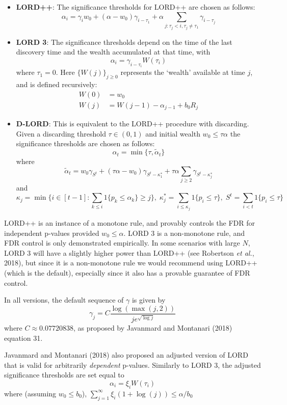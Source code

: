 \documentclass[
]{article}
\begin{document}
\begin{itemize}
\item
  \textbf{LORD++}: The significance thresholds for LORD++ are chosen as
  follows: \[
  \alpha_i = \gamma_i w_0 + (\alpha - w_0) \gamma_{i-\tau_1} + 
  \alpha \sum_{j : \tau_j < i, \tau_j \neq \tau_1} \gamma_{i - \tau_j}
  \]
\item
  \textbf{LORD 3}: The significance thresholds depend on the time of the
  last discovery time and the wealth accumulated at that time, with \[
  \alpha_i  = \gamma_{i - \tau_i} W(\tau_i)
  \] where \(\tau_1 = 0\). Here \(\{W(j)\}_{j \geq 0}\) represents the
  `wealth' available at time \(j\), and is defined recursively: \[
  \begin{align}
  W(0) & = w_0 \nonumber \\
  W(j) & = W(j-1) - \alpha_{j-1} + b_0 R_j
  \end{align}
  \]
\item
  \textbf{D-LORD}: This is equivalent to the LORD++ procedure with
  discarding. Given a discarding threshold \(\tau \in (0,1)\) and
  initial wealth \(w_0 \leq \tau\alpha\) the significance thresholds are
  chosen as follows: \[ 
  \alpha_t = \min\{\tau, \tilde{\alpha}_t\}
  \] where \[
  \tilde{\alpha}_t = w_0 \gamma_{S^t} +
  (\tau\alpha - w_0)\gamma_{S^t - \kappa_1^*} + 
  \tau\alpha \sum_{j \geq 2} \gamma_{S^t - \kappa_j^*}
  \] and \[
  \kappa_j = \min\{i \in [t-1] : \sum_{k \leq i} 
  1 \{p_k \leq \alpha_k\} \geq j\}, \;
  \kappa_j^* = \sum_{i \leq \kappa_j} 1 \{p_i \leq \tau \}, \;
  S^t = \sum_{i < t} 1 \{p_i \leq \tau \}
  \]
\end{itemize}

LORD++ is an instance of a monotone rule, and provably controls the FDR
for independent p-values provided \(w_0 \leq \alpha\). LORD 3 is a
non-monotone rule, and FDR control is only demonstrated empirically. In
some scenarios with large \(N\), LORD 3 will have a slightly higher
power than LORD++ (see Robertson \emph{et al.}, 2018), but since it is a
non-monotone rule we would recommend using LORD++ (which is the
default), especially since it also has a provable guarantee of FDR
control.

In all versions, the default sequence of \(\gamma\) is given by
\[\gamma_j = C \frac{\log(\max(j, 2))}{j e^{\sqrt{\log j}}}\] where
\(C \approx 0.07720838\), as proposed by Javanmard and Montanari (2018)
equation 31.

Javanmard and Montanari (2018) also proposed an adjusted version of LORD
that is valid for arbitrarily \emph{dependent} p-values. Similarly to
LORD 3, the adjusted significance thresholds are set equal to
\[ \alpha_i = \xi_i W(\tau_i)\] where (assuming \(w_0 \leq b_0\)),
\(\sum_{j=1}^{\infty} \xi_i (1 + \log(j)) \leq \alpha / b_0\)
\end{document}
